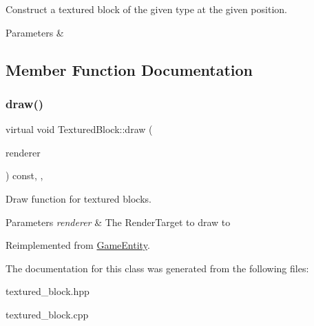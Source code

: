 Construct a textured block of the given type at the given position. 


\begin{DoxyParams}{Parameters}
{\em } & \\
\hline
\end{DoxyParams}


\subsection{Member Function Documentation}
\mbox{\label{class_textured_block_a2c8d3fa594f02632bba0c7d54909c988}} 
\subsubsection{\texorpdfstring{draw()}{draw()}}
{\footnotesize\ttfamily virtual void Textured\+Block\+::draw (\begin{DoxyParamCaption}\item[{\mbox{\hyperlink{classsf_1_1_render_target}{sf\+::\+Render\+Target}} \&}]{renderer }\end{DoxyParamCaption}) const\hspace{0.3cm}{\ttfamily [inline]}, {\ttfamily [override]}, {\ttfamily [virtual]}}



Draw function for textured blocks. 


\begin{DoxyParams}{Parameters}
{\em renderer} & The Render\+Target to draw to \\
\hline
\end{DoxyParams}


Reimplemented from \mbox{\hyperlink{class_game_entity_ae8417c4fa668594827706c44091f7366}{Game\+Entity}}.



The documentation for this class was generated from the following files\+:\begin{DoxyCompactItemize}
\item 
textured\+\_\+block.\+hpp\item 
textured\+\_\+block.\+cpp\end{DoxyCompactItemize}
